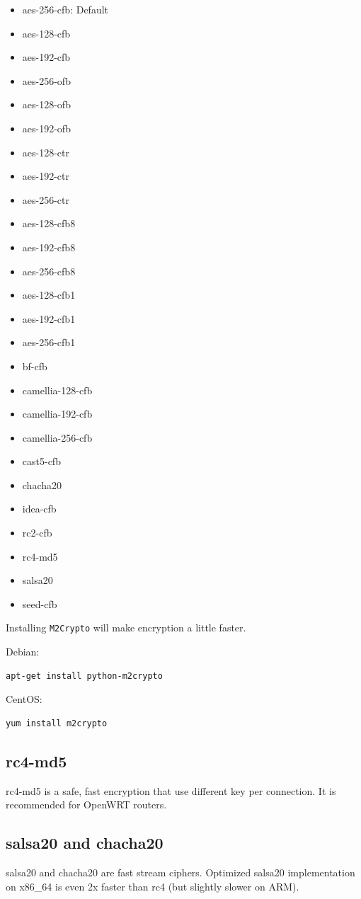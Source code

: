 \documentclass[11pt,a4paper]{sphinxmanual}
\begin{document}
\begin{itemize}
\item aes-256-cfb: Default
\item aes-128-cfb
\item aes-192-cfb
\item aes-256-ofb
\item aes-128-ofb
\item aes-192-ofb
\item aes-128-ctr
\item aes-192-ctr
\item aes-256-ctr
\item aes-128-cfb8
\item aes-192-cfb8
\item aes-256-cfb8
\item aes-128-cfb1
\item aes-192-cfb1
\item aes-256-cfb1
\item bf-cfb
\item camellia-128-cfb
\item camellia-192-cfb
\item camellia-256-cfb
\item cast5-cfb
\item chacha20
\item idea-cfb
\item rc2-cfb
\item rc4-md5
\item salsa20
\item seed-cfb
\end{itemize}

Installing \verb~M2Crypto~ will make encryption a little faster.

Debian:
\begin{Verbatim}
apt-get install python-m2crypto
\end{Verbatim}

CentOS:
\begin{Verbatim}
yum install m2crypto
\end{Verbatim}

\subsection{rc4-md5}
\label{sec-5-4-2}
rc4-md5 is a safe, fast encryption that use different key per connection. It is recommended for OpenWRT routers.

\subsection{salsa20 and chacha20}
\label{sec-5-4-3}
salsa20 and chacha20 are fast stream ciphers. Optimized salsa20 implementation on x86\_64 is even 2x faster than rc4 (but slightly slower on ARM).
\end{document}
